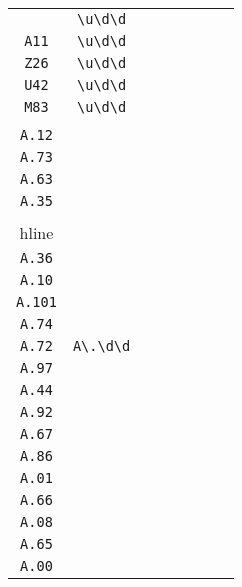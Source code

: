 \begin{longtable}{cccccccc}
\begin{tabular}{ll}
    \verb|H00| & \verb|\u\d\d|\\
\verb|A11| & \verb|\u\d\d|\\
\verb|Z26| & \verb|\u\d\d|\\
\verb|U42| & \verb|\u\d\d|\\
\verb|M83| & \verb|\u\d\d|
\end{tabular}
\\\midrule 
\begin{tabular}{l}
    \verb|A.17|\\
\verb|A.12|\\
\verb|A.73|\\
\verb|A.63|\\
\verb|A.35|\\
\\hline\\
\verb|A.36|\\
\verb|A.10|\\
\verb|A.101|\\
\verb|A.74|\\
\verb|A.72|
\end{tabular}

&
\verb|A\.\d\d|
&

\begin{tabular}{l}
    \verb|A\.\d\d|\\
\verb|A.97|\\
\verb|A.44|\\
\verb|A.92|\\
\verb|A.67|\\
\verb|A.86|
\end{tabular}

&

\begin{tabular}{l}
    \verb|A\.\d\d|\\
\verb|A.01|\\
\verb|A.66|\\
\verb|A.08|\\
\verb|A.65|\\
\verb|A.00|
\end{tabular}

&


\end{longtable}
